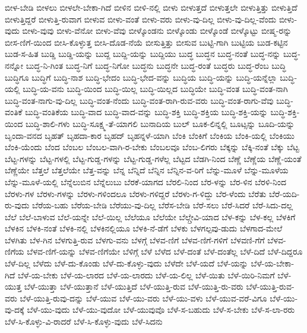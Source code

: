 {ಬೀಳ-ಬೇಡಿ
ಬೀಳಲು
ಬೀಳಲೇ-ಬೇಕಾ-ಗಿದೆ
ಬೀಳಿನ
ಬೀಳಿ-ನಲ್ಲಿ
ಬೀಳು
ಬೀಳುತ್ತದೆ
ಬೀಳುತ್ತಲೇ
ಬೀಳುತ್ತಿತ್ತು
ಬೀಳುತ್ತಿದೆ
ಬೀಳುತ್ತಿದ್ದರೆ
ಬೀಳುತ್ತಿ-ರುವಾಗ
ಬೀಳುವ
ಬೀಳು-ವಂತೆ
ಬೀಳು-ವರು
ಬೀಳು-ವು-ದಿಲ್ಲ
ಬೀಳು-ವು-ದಿಲ್ಲ-ವೆಂದು
ಬೀಳು-ವುದು
ಬೀಳು-ವುವು
ಬೀಳು-ವೆನೋ
ಬೀಳು-ವೆವು
ಬೀಳ್ಕೊಂಡನು
ಬೀಳ್ಕೊಂಡು
ಬೀಳ್ಕೊಂಡೆ
ಬೀಳ್ಕೊಟ್ಟು
ಬೀಷ್ಮ-ರನ್ನು
ಬೀಸ-ಣಿಗೆ-ಯಿಂದ
ಬೀಸಿ-ಕೊಳ್ಳುತ್ತ
ಬೀಸಿ-ದೊಡ-ನೆಯೆ
ಬೀಸುತ್ತಿತ್ತು
ಬೀಸುವ
ಬುಟ್ಟಿ-ಗಾಗಿ
ಬುಟ್ಟಿಯ
ಬುಡ-ಕಟ್ಟಿನ
ಬುಡ-ಸ-ಹಿತ
ಬುಡ್ಡಿ
ಬುಡ್ಡಿ-ಯನ್ನು
ಬುದ್ದ
ಬುದ್ದಿ-ಯನ್ನು
ಬುದ್ದಿಯು
ಬುದ್ಧ
ಬುದ್ಧನ
ಬುದ್ಧ-ನಂತೆ
ಬುದ್ಧ-ನನ್ನು
ಬುದ್ಧ-ನನ್ನೋ
ಬುದ್ಧ-ನಿ-ಗಿಂತ
ಬುದ್ಧ-ನಿಗೆ
ಬುದ್ಧ-ನಿಗೋ
ಬುದ್ಧನು
ಬುದ್ಧನೇ
ಬುದ್ಧ-ರಂತೆ
ಬುದ್ಧರು
ಬುದ್ಧ-ರೆಂಬ
ಬುದ್ಧಿ
ಬುದ್ಧಿಗೂ
ಬುದ್ಧಿಗೆ
ಬುದ್ಧಿ-ನಾಶ
ಬುದ್ಧಿ-ಭೇದಂ
ಬುದ್ಧಿ-ಭೇದ-ವನ್ನು
ಬುದ್ಧಿಯ
ಬುದ್ಧಿ-ಯನ್ನು
ಬುದ್ಧಿ-ಯನ್ನೆಲ್ಲಾ
ಬುದ್ಧಿ-ಯಲ್ಲಿ
ಬುದ್ಧಿ-ಯ-ವನು
ಬುದ್ಧಿ-ಯಿಂದ
ಬುದ್ಧಿ-ಯಿಲ್ಲ
ಬುದ್ಧಿ-ಯಿಲ್ಲದ
ಬುದ್ಧಿಯೇ
ಬುದ್ಧಿ-ವಂತ
ಬುದ್ಧಿ-ವಂತ-ನಾಗಿ
ಬುದ್ಧಿ-ವಂತ-ನಾಗು-ವು-ದಿಲ್ಲ
ಬುದ್ಧಿ-ವಂತ-ನೆಂದು
ಬುದ್ಧಿ-ವಂತ-ರಾಗಿ-ರುವ-ವರು
ಬುದ್ಧಿ-ವಂತ-ರಾಗು-ವೆವು
ಬುದ್ಧಿ-ವಂತಿಕೆ
ಬುದ್ಧಿ-ವಂತಿಕೆಯ
ಬುದ್ಧಿ-ವಾದ
ಬುದ್ಧಿ-ವಾದ-ವನ್ನು
ಬುದ್ಧಿ-ಶಕ್ತಿ
ಬುದ್ಧಿ-ಶಕ್ತಿಯ
ಬುದ್ಧಿ-ಶಕ್ತಿ-ಯನ್ನು
ಬುದ್ಧಿ-ಶಕ್ತಿ-ಯಿಂದ
ಬುದ್ಧಿ-ಶಾಲಿ-ಗಳು
ಬುದ್ಧಿ-ಸೂಕ್ಷ್ಮ-ತೆ-ಯಾಗಲಿ
ಬುನಾದಿಯ
ಬುಲ್
ಬೂಕ-ಲಿನ್ನಲ್ಲಿ
ಬೂಟ್ಸನ್ನು
ಬೂದಿ-ಯನ್ನು
ಬೃಂದಾ-ವನದ
ಬೃಹತ್
ಬೃಹದಾ-ಕಾರ
ಬೃಹದ್
ಬೃಹನ್ನಳೆ-ಯಾಗಿ
ಬೆಂಕಿ
ಬೆಂಕಿಗೆ
ಬೆಂಕಿಯ
ಬೆಂಕಿ-ಯಲ್ಲಿ
ಬೆಂಕಿಯು
ಬೆಂಕಿ-ಯೆಂದು
ಬೆಂದ
ಬೆಂಬಲ
ಬೆಂಬಲ-ವಾಗಿ-ರ-ಬೇಕು
ಬೆಂಬಲವೂ
ಬೆಂಬ-ಲಿಗರು
ಬೆಕ್ಕನ್ನು
ಬೆಕ್ಕಿ-ನಂತೆ
ಬೆಕ್ಕು
ಬೆಟ್ಟ
ಬೆಟ್ಟ-ಗಳನ್ನು
ಬೆಟ್ಟ-ಗಳಲ್ಲಿ
ಬೆಟ್ಟ-ಗುಡ್ಡ-ಗಳನ್ನು
ಬೆಟ್ಟ-ಗುಡ್ಡ-ಗಳೆಲ್ಲ
ಬೆಟ್ಟದ
ಬೆಡಗಿ-ನಿಂದ
ಬೆಣ್ಣೆ
ಬೆಣ್ಣೆಯ
ಬೆಣ್ಣೆ-ಯಂತೆ
ಬೆಣ್ಣೆಯೇ
ಬೆತ್ತಲೆ
ಬೆತ್ತಲೆಯೇ
ಬೆತ್ತ-ವನ್ನು
ಬೆನ್ನ
ಬೆನ್ನಿದೆ
ಬೆನ್ನಿನ
ಬೆನ್ನಿನ-ವ-ರಿಗೆ
ಬೆನ್ನು-ಮೂಳೆ
ಬೆನ್ನು-ಮೂಳೆಯ
ಬೆನ್ನು-ಮೂಳೆ-ಯಲ್ಲಿ
ಬೆನ್ನೆಲುಬಿನ
ಬೆನ್ನೆಲುಬು
ಬೆರಕೆ-ಯಾಗದ
ಬೆರಲಿ-ನಿಂದ
ಬೆರ-ಳನ್ನು
ಬೆರ-ಳಿನ
ಬೆರಳಿ-ನಿಂದ
ಬೆರಳು-ಗಳ
ಬೆರಳು-ಗಳನ್ನು
ಬೆರಳು-ಗಳಿಂದಲೂ
ಬೆರಳು-ಗಳಿದ್ದರೆ
ಬೆರಳು-ಗ-ಳಿದ್ದು
ಬೆರ-ಳೆಂದು
ಬೆರೆತು
ಬೆರೆ-ಯದಿ-ರು-ವುದು
ಬೆರೆಯ-ಬಹು
ಬೆರೆಯ-ಬೇಡಿ
ಬೆರೆಯು-ವು-ದಿಲ್ಲ
ಬೆರೆಸ-ಬೇಡಿ
ಬೆರೆ-ಸಲು
ಬೆರೆ-ಸಿದರೆ
ಬೆರೆ-ಸಿದು-ದಲ್ಲ
ಬೆಲೆ
ಬೆಲೆ-ಬಾಳುವ
ಬೆಲೆ-ಯನ್ನೇ
ಬೆಲೆ-ಯಿಲ್ಲ
ಬೆಲೆಯೂ
ಬೆಲೆಯೇ
ಬೆಲ್ಗ್ರೇವಿ-ಯಾದ
ಬೆಳ-ಕನ್ನು
ಬೆಳ-ಕಲ್ಲ
ಬೆಳಕಿಗೆ
ಬೆಳಕಿನ
ಬೆಳಕಿ-ನಂತೆ
ಬೆಳಕಿ-ನಲ್ಲಿ
ಬೆಳಕಿನಲ್ಲಿಯೂ
ಬೆಳಕಿ-ನೆ-ಡೆಗೆ
ಬೆಳಕು
ಬೆಳಗಲ್ಪವು-ಡುದು
ಬೆಳಗಾದ-ಮೇಲೆ
ಬೆಳಗಿತು
ಬೆಳ-ಗಿನ
ಬೆಳಗುತ್ತಿ-ರುವ
ಬೆಳಗು-ವನು
ಬೆಳಗ್ಗೆ
ಬೆಳವ-ಣಿಗೆ
ಬೆಳವ-ಣಿಗೆ-ಗಳಿಗೆ
ಬೆಳವಣಿ-ಗೆಗೆ
ಬೆಳವ-ಣಿಗೆಯ
ಬೆಳವ-ಣಿಗೆ-ಯನ್ನು
ಬೆಳವ-ಣಿಗೆಯೇ
ಬೆಳಿಗ್ಗೆ
ಬೆಳೆ
ಬೆಳೆದ
ಬೆಳೆ-ದಂತೆ
ಬೆಳೆ-ದಂತೆಲ್ಲ
ಬೆಳೆ-ದಿದೆ
ಬೆಳೆ-ದಿದ್ದರೂ
ಬೆಳೆ-ದಿಲ್ಲ
ಬೆಳೆದು
ಬೆಳೆ-ದು-ಕೊಂಡು
ಬೆಳೆ-ದು-ಕೊಳ್ಳು-ವುದು
ಬೆಳೆದೇ
ಬೆಳೆ-ಯದೆ
ಬೆಳೆ-ಯನ್ನು
ಬೆಳೆ-ಯ-ಬೇಕಾ-ಗಿದೆ
ಬೆಳೆ-ಯ-ಬೇಕು
ಬೆಳೆ-ಯ-ಲಾರದ
ಬೆಳೆ-ಯ-ಲಾರದು
ಬೆಳೆ-ಯ-ಲಿಲ್ಲ
ಬೆಳೆ-ಯಿತು
ಬೆಳೆ-ಯಿರಿ-ನಿಮಗೆ
ಬೆಳೆ-ಯುತ್ತ
ಬೆಳೆ-ಯುತ್ತಾ
ಬೆಳೆ-ಯುತ್ತಾನೆ
ಬೆಳೆ-ಯುತ್ತಿದೆ
ಬೆಳೆ-ಯುತ್ತಿ-ರುವ
ಬೆಳೆ-ಯುತ್ತಿ-ರು-ವರು
ಬೆಳೆ-ಯುತ್ತಿ-ರುವ-ವರು
ಬೆಳೆ-ಯುತ್ತಿ-ರುವು-ದನ್ನು
ಬೆಳೆ-ಯುವ
ಬೆಳೆ-ಯು-ವರು
ಬೆಳೆ-ಯು-ವಳು
ಬೆಳೆ-ಯುವ-ವರೆ-ವಿಗೂ
ಬೆಳೆ-ಯು-ವು-ದಕ್ಕೆ
ಬೆಳೆ-ಯು-ವುದು
ಬೆಳೆ-ಯು-ವುದೋ
ಬೆಳೆ-ಯುವುವೊ
ಬೆಳೆ-ಸ-ಬಹುದು
ಬೆಳೆ-ಸ-ಬೇಕು
ಬೆಳೆ-ಸ-ಲಾ-ರರು
ಬೆಳೆ-ಸಿ-ಕೊಳ್ಳು-ವಿ-ರಾದರೆ
ಬೆಳೆ-ಸಿ-ಕೊಳ್ಳು-ವುದು
ಬೆಳೆ-ಸಿದನು
}
